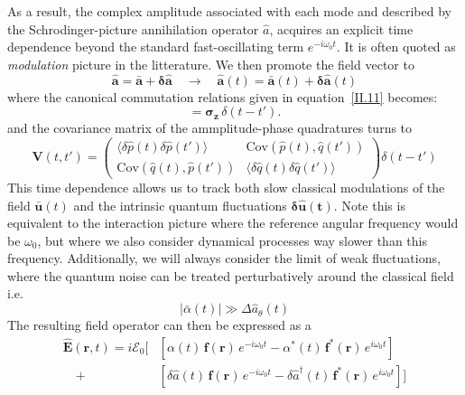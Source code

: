 As a result, the complex amplitude associated with each mode and described by the Schrodinger-picture annihilation operator $\hat{a}$, acquires an explicit time dependence beyond the standard fast-oscillating term $e^{-i\omega_0 t}$. It is often quoted as \textit{modulation} picture in the litterature. We then promote the field vector to 
\begin{equation}
\mathbf{\hat{a}}= \mathbf{\bar{a}} + \mathbf{\delta \hat{a}} \quad \rightarrow \quad
  \mathbf{\hat{a}}(t)=
 \mathbf{\bar{a}}(t) + \mathbf{\delta \hat{a}}(t)
\end{equation}
where the canonical commutation relations given in equation~\eqref{II.11} becomes:
\begin{equation}
  [\delta\mathbf{\hat{a}}(t), \delta \mathbf{\hat{a}}^{\dagger}(t')] = \mathbf{\sigma_z} \, \delta (t-t').
\end{equation}
and the covariance matrix of the ammplitude-phase quadratures turns to
\begin{equation}
\mathbf{V}(t, t') = \begin{pmatrix}
\langle \delta \hat{p}(t) \delta \hat{p}(t') \rangle &
\mathrm{Cov}(\hat{p}(t),\hat{q}(t')) \\[4pt]
\mathrm{Cov}(\hat{q}(t),\hat{p}(t'))  &
\langle \delta \hat{q}(t) \delta \hat{q}(t') \rangle 
\end{pmatrix} \delta(t-t')
\end{equation}
This time dependence allows us to track both slow classical modulations of the field $\mathbf{\bar{u}}(t)$ and the intrinsic quantum fluctuations $\mathbf{\delta \hat{u}(t)}$. Note this is equivalent to the interaction picture where the reference angular frequency would be $\omega_0$, but where we also consider dynamical processes way slower than this frequency. Additionally, we will always consider the limit of weak fluctuations, where the quantum noise can be treated perturbatively around the classical field i.e. 
\[
|\bar{\alpha}(t)| \gg \Delta \hat a_\theta(t)
\]
The resulting field operator can then be expressed as a 
\begin{equation}
\begin{aligned}
\hat{\mathbf{E}}(\mathbf{r}, t) 
=i  \mathcal{E}_0 \bigg[ & \left[ \alpha(t)\, \mathbf{f}(\mathbf{r})\, e^{-i \omega_0 t} 
- \alpha^*(t)\, \mathbf{f}^*(\mathbf{r})\, e^{i \omega_0 t} \right] \\
\quad +  &\left[ \delta \hat{a}(t)\, \mathbf{f}(\mathbf{r})\, e^{-i \omega_0 t}
- \delta \hat{a}^\dagger(t)\, \mathbf{f}^*(\mathbf{r})\, e^{i \omega_0 t} \right] \bigg]
\end{aligned}
\end{equation} 

